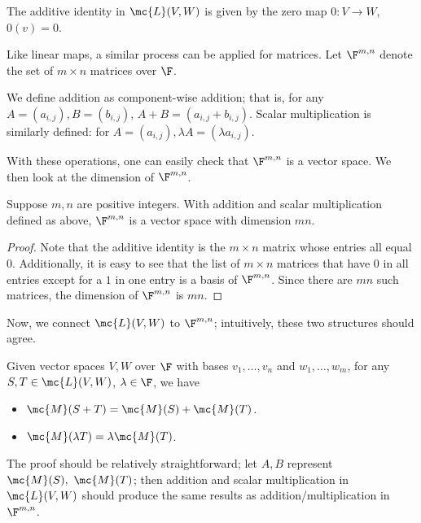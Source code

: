 \documentclass[math0540-lecture-notes.tex]{subfiles}
\begin{document}
The additive identity in $\mc{L}(V,W)$ is given by the zero map $0:V\to W$, $0(v)=0$.

Like linear maps, a similar process can be applied for matrices. Let $\F^{m,n}$ denote the set of
$m\times n$ matrices over $ \F$.
\begin{definition}{}
  We define addition as component-wise addition; that is, for any $A=(a_{i,j}), B=(b_{i,j})$,
  $A+B=(a_{i,j}+b_{i,j})$. Scalar multiplication is similarly defined: for $A=(a_{i,j}), \lambda A =
  (\lambda a_{i,j})$.
\end{definition}
With these operations, one can easily check that $\F^{m,n}$ is a vector space. We then look at the
dimension of $\F^{m,n}$.

\begin{proposition}[$\dim{\F^{m,n}}=mn$]{}
  Suppose $m,n$ are positive integers. With addition and scalar multiplication defined as above,
  $\F^{m,n}$ is a vector space with dimension $mn$.
\end{proposition}
\begin{proof}[Proof]
  Note that the additive identity is the $m\times n$ matrix whose entries all equal $0$.
  Additionally, it is easy to see that the list of $m\times n$ matrices that have $0$ in all entries
  except for a $1$ in one entry is a basis of $\F^{m,n}$. Since there are $mn$ such matrices, the
  dimension of $\F^{m,n}$ is $mn$.
\end{proof}

Now, we connect $\mc{L}(V,W)$ to $\F^{m,n}$; intuitively, these two structures should agree.
\begin{proposition}[]{} 
  Given vector spaces $V,W$ over $ \F$ with bases $v_1,\ldots,v_n$ and $w_1,\ldots,w_m$, for any
  $S,T\in \mc{L}(V,W)$, $\lambda\in \F$, we have
  \begin{itemize}
    \item $\mc{M}(S+T)=\mc{M}(S)+\mc{M}(T)$.
    \item $\mc{M}(\lambda T)=\lambda\mc{M}(T)$.
  \end{itemize}
\end{proposition}
The proof should be relatively straightforward; let $A,B$ represent $\mc{M}(S),\ \mc{M}(T)$; then
addition and scalar multiplication in $\mc{L}(V,W)$ should produce the same results as
addition/multiplication in $\F^{m,n}$.
\end{document}
